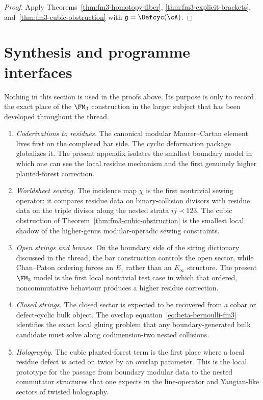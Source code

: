 \begin{proof}
Apply Theorems~\ref{thm:fm3-homotopy-fiber},
\ref{thm:fm3-explicit-brackets}, and~\ref{thm:fm3-cubic-obstruction} with
$\mathfrak g=\Defcyc(\cA)$.
\end{proof}

\section{Synthesis and programme interfaces}
\label{sec:fm3-synthesis-programme}

Nothing in this section is used in the proofs above.  Its purpose is only to
record the exact place of the $\FM_3$ construction in the larger subject that
has been developed throughout the thread.

\begin{enumerate}[label=\textup{(\arabic*)}]
\item \emph{Coderivations to residues.}
  The canonical modular Maurer--Cartan element lives first on the completed bar
  side.  The cyclic deformation package globalizes it.  The present appendix
  isolates the smallest boundary model in which one can see the local residue
  mechanism and the first genuinely higher planted-forest correction.
\item \emph{Worldsheet sewing.}
  The incidence map $\chi$ is the first nontrivial sewing operator: it compares
  residue data on binary-collision divisors with residue data on the triple
  divisor along the nested strata $ij\prec 123$.  The cubic obstruction of
  Theorem~\ref{thm:fm3-cubic-obstruction} is the smallest local shadow of the
  higher-genus modular-operadic sewing constraints.
\item \emph{Open strings and branes.}
  On the boundary side of the string dictionary discussed in the thread, the bar
  construction controls the open sector, while Chan--Paton ordering forces an
  $E_1$ rather than an $E_\infty$ structure.  The present $\FM_3$ model is the
  first local nontrivial test case in which that ordered, noncommutative
  behaviour produces a higher residue correction.
\item \emph{Closed strings.}
  The closed sector is expected to be recovered from a cobar or defect-cyclic
  bulk object.  The overlap equation~\eqref{eq:beta-bernoulli-fm3} identifies
  the exact local gluing problem that any boundary-generated bulk candidate must
  solve along codimension-two nested collisions.
\item \emph{Holography.}
  The cubic planted-forest term is the first place where a local residue defect
  is acted on twice by an overlap parameter.  This is the local prototype for the
  passage from boundary modular data to the nested commutator structures that one
  expects in the line-operator and Yangian-like sectors of twisted holography.
\end{enumerate}

